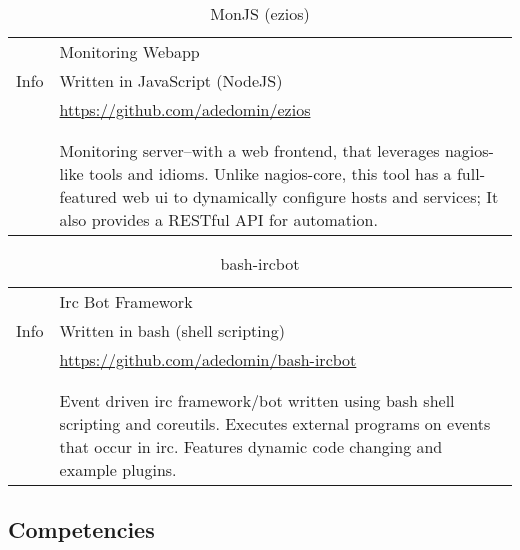 \documentclass[letterpaper,]{article}
\begin{document}
\begin{table}[!ht]
\centering
    \caption{MonJS (ezios)}
    \begin{tabularx}{\textwidth}{r|X}
        \multirow{3}{*}{Info} & Monitoring Webapp \\
                              & Written in JavaScript (NodeJS) \\
                              & \href{https://github.com/adedomin/ezios}{https://github.com/adedomin/ezios} \\
        & \\
        \begin{tabular}{@{}l@{}}
            Description \\
        \end{tabular}
        & Monitoring server--with a web frontend, that leverages nagios-like 
        tools and idioms. Unlike nagios-core, this tool has a full-featured 
        web ui to dynamically configure hosts and services; It also provides
        a RESTful API for automation.
    \end{tabularx}
\end{table}

\begin{table}[!ht]
\centering
    \caption{bash-ircbot}
    \begin{tabularx}{\textwidth}{r|X}
        \multirow{3}{*}{Info} & Irc Bot Framework \\
                              & Written in bash (shell scripting) \\
                              & \href{https://github.com/adedomin/bash-ircbot}{https://github.com/adedomin/bash-ircbot} \\
        & \\
        \begin{tabular}{@{}l@{}}
            Description \\
        \end{tabular}
        & Event driven irc framework/bot 
        written using bash shell scripting and coreutils.
        Executes external programs on events that occur in irc.
        Features dynamic code changing and example plugins. 
    \end{tabularx}
\end{table}

\subsection{Competencies}\label{competencies}
\end{document}
